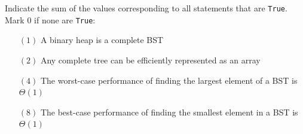 \documentclass[12pt,addpoints]{exam}
\begin{document}
\begin{questions}
\question[5] 
Indicate the sum of the values corresponding to all statements that are \verb|True|.  Mark $0$ if none are \verb|True|:
\begin{itemize}
	\item[$(1)$] A binary heap is a complete BST
	\item[$(2)$] Any complete tree can be efficiently represented as an array
	\item[$(4)$] The worst-case performance of finding the largest element of a BST is $\Theta(1)$
	\item[$(8)$] The best-case performance of finding the smallest element in a BST is $\Theta(1)$\end{itemize}
\answerline

\end{questions}
\end{document}
